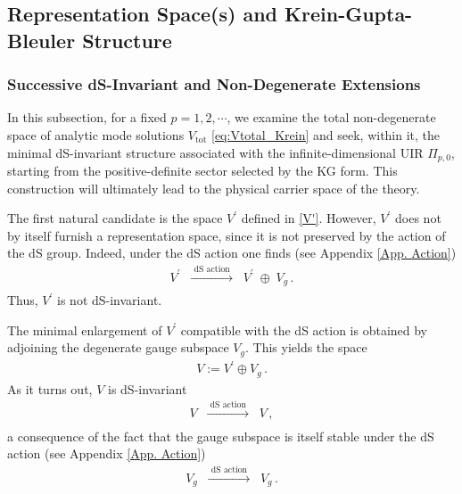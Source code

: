 \documentclass[aps,twocolumn,nofootinbib]{revtex4}
\begin{document}
\subsection{Representation Space(s) and Krein-Gupta-Bleuler Structure} \label{Sec. RepSpaces}


\subsubsection{Successive dS-Invariant and Non-Degenerate Extensions}\label{Sec. dSAction}

In this subsection, for a fixed $p=1,2,\cdots$, we examine the total non-degenerate space of analytic mode solutions $V_{\text{tot}}$ \eqref{eq:Vtotal_Krein} and seek, within it, the minimal dS-invariant structure associated with the infinite-dimensional UIR $\Pi_{p,0}$, starting from the positive-definite sector selected by the KG form. This construction will ultimately lead to the physical carrier space of the theory.

The first natural candidate is the space $V^\prime$ defined in \eqref{V'}. However, $V^\prime$ does not by itself furnish a representation space, since it is not preserved by the action of the dS group. Indeed, under the dS action one finds (see Appendix \ref{App. Action})
\begin{align}\label{mix.action}
    V^\prime \;\;\xrightarrow[]{\text{ dS action }}\;\; V^\prime \;\oplus\; V_g \,.
\end{align}
Thus, $V^\prime$ is not dS-invariant. 

The minimal enlargement of $V^\prime$ compatible with the dS action is obtained by adjoining the degenerate gauge subspace $V_g$. This yields the space 
\begin{align}
    V := V^\prime \oplus V_g \,.
\end{align}
As it turns out, $V$ is dS-invariant
\begin{align}
    V\;\; \xrightarrow[]{\text{ dS action }}\;\;V\,,
\end{align}
a consequence of the fact that the gauge subspace is itself stable under the dS action (see Appendix \ref{App. Action})
\begin{align}\label{gau-ds}
    V_g\;\; \xrightarrow[]{\text{ dS action }}\;\;V_g \,.
\end{align}
\end{document}
